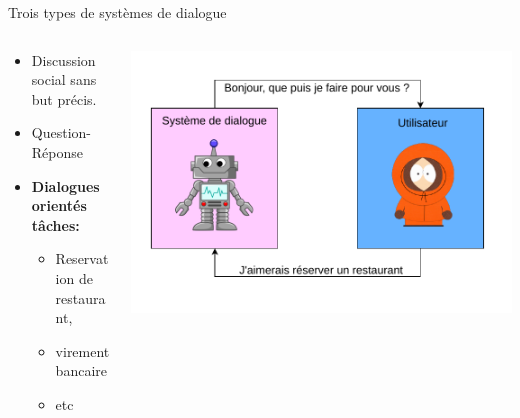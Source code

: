 \documentclass[french]{beamer}
\begin{document}
    \begin{frame}{Trois types de systèmes de dialogue}
        \begin{columns}
            \begin{column}{0.5\textwidth}
                \begin{itemize}
                    \item Discussion social sans but précis.
                    \item Question-Réponse
                    \item \textbf{Dialogues orientés tâches:}
                    \begin{itemize}
                        \item Reservation de restaurant,
                        \item virement bancaire
                        \item etc
                    \end{itemize}
                \end{itemize}
            \end{column}
            \begin{column}{0.5\textwidth}  %
                \begin{center}
                    \includegraphics[width=1.0\textwidth]{drawio/out/sds.pdf}
                \end{center}
            \end{column}
        \end{columns}
    \end{frame}
\end{document}
